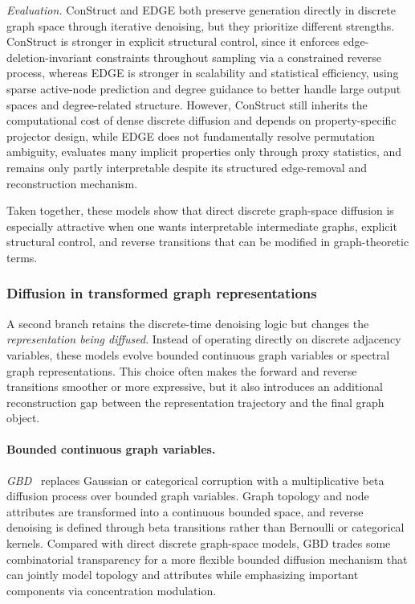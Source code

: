 \documentclass{article}
\begin{document}
\emph{Evaluation.}
ConStruct and EDGE both preserve generation directly in discrete graph space through iterative denoising, but they prioritize different strengths. ConStruct is stronger in explicit structural control, since it enforces edge-deletion-invariant constraints throughout sampling via a constrained reverse process, whereas EDGE is stronger in scalability and statistical efficiency, using sparse active-node prediction and degree guidance to better handle large output spaces and degree-related structure. However, ConStruct still inherits the computational cost of dense discrete diffusion and depends on property-specific projector design, while EDGE does not fundamentally resolve permutation ambiguity, evaluates many implicit properties only through proxy statistics, and remains only partly interpretable despite its structured edge-removal and reconstruction mechanism.

Taken together, these models show that direct discrete graph-space diffusion is especially attractive when one wants interpretable intermediate graphs, explicit structural control, and reverse transitions that can be modified in graph-theoretic terms.

\subsubsection{Diffusion in transformed graph representations}
\label{sec:alternative_rep_discrete_diffusion}


A second branch retains the discrete-time denoising logic but changes the \emph{representation being diffused}. Instead of operating directly on discrete adjacency variables, these models evolve bounded  continuous graph variables or spectral graph representations. This choice often makes the forward and reverse transitions smoother or more expressive, but it also introduces an additional reconstruction gap between the representation trajectory and the final graph object.

\paragraph{Bounded continuous graph variables.}
\emph{GBD}~\cite{liu2024advancing} replaces Gaussian or categorical corruption with a multiplicative beta diffusion process over bounded graph variables. Graph topology and node attributes are transformed into a continuous bounded space, and reverse denoising is defined through beta transitions rather than Bernoulli or categorical kernels. Compared with direct discrete graph-space models, GBD trades some combinatorial transparency for a more flexible bounded diffusion mechanism that can jointly model topology and attributes while emphasizing important components via concentration modulation.
\end{document}

